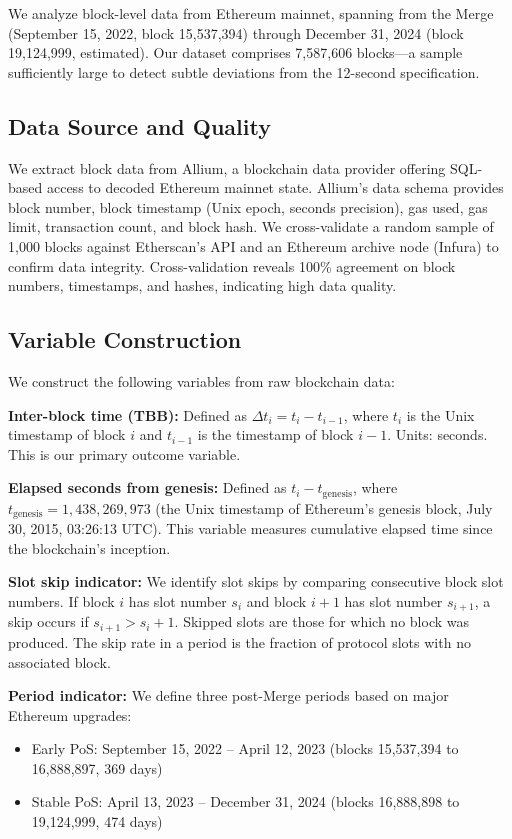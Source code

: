 \documentclass[12pt]{article}
\begin{document}
We analyze block-level data from Ethereum mainnet, spanning from the Merge (September 15, 2022, block 15,537,394) through December 31, 2024 (block 19,124,999, estimated). Our dataset comprises 7,587,606 blocks—a sample sufficiently large to detect subtle deviations from the 12-second specification.

\subsection{Data Source and Quality}

We extract block data from Allium, a blockchain data provider offering SQL-based access to decoded Ethereum mainnet state. Allium's data schema provides block number, block timestamp (Unix epoch, seconds precision), gas used, gas limit, transaction count, and block hash. We cross-validate a random sample of 1,000 blocks against Etherscan's API and an Ethereum archive node (Infura) to confirm data integrity. Cross-validation reveals 100\% agreement on block numbers, timestamps, and hashes, indicating high data quality.

\subsection{Variable Construction}

We construct the following variables from raw blockchain data:

\textbf{Inter-block time (TBB):} Defined as $\Delta t_i = t_i - t_{i-1}$, where $t_i$ is the Unix timestamp of block $i$ and $t_{i-1}$ is the timestamp of block $i-1$. Units: seconds. This is our primary outcome variable.

\textbf{Elapsed seconds from genesis:} Defined as $t_i - t_{\text{genesis}}$, where $t_{\text{genesis}} = 1,438,269,973$ (the Unix timestamp of Ethereum's genesis block, July 30, 2015, 03:26:13 UTC). This variable measures cumulative elapsed time since the blockchain's inception.

\textbf{Slot skip indicator:} We identify slot skips by comparing consecutive block slot numbers. If block $i$ has slot number $s_i$ and block $i+1$ has slot number $s_{i+1}$, a skip occurs if $s_{i+1} > s_i + 1$. Skipped slots are those for which no block was produced. The skip rate in a period is the fraction of protocol slots with no associated block.

\textbf{Period indicator:} We define three post-Merge periods based on major Ethereum upgrades:
\begin{itemize}
\item Early PoS: September 15, 2022 – April 12, 2023 (blocks 15,537,394 to 16,888,897, 369 days)
\item Stable PoS: April 13, 2023 – December 31, 2024 (blocks 16,888,898 to 19,124,999, 474 days)
\end{itemize}
\end{document}
